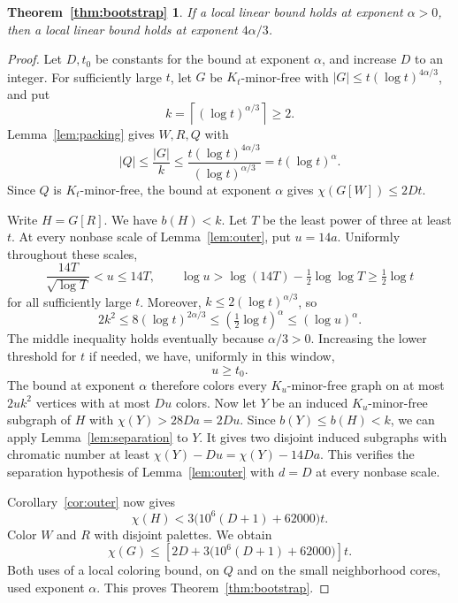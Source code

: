 \documentclass[11pt]{article}
\newtheorem*{bootstraptheorem}{Theorem~\ref{thm:bootstrap}}
\begin{document}
\begin{bootstraptheorem}
If a local linear bound holds at exponent $\alpha>0$, then a local
linear bound holds at exponent $4\alpha/3$.
\end{bootstraptheorem}
\begin{proof}
Let $D,t_0$ be constants for the bound at exponent $\alpha$, and
increase $D$ to an integer.
For sufficiently large $t$, let $G$ be $K_t$-minor-free with
$|G|\le t(\log t)^{4\alpha/3}$, and put
\[
 k=\left\lceil(\log t)^{\alpha/3}\right\rceil\ge2.
\]
Lemma~\ref{lem:packing} gives $W,R,Q$ with
\[
 |Q|\le\frac{|G|}{k}
 \le\frac{t(\log t)^{4\alpha/3}}{(\log t)^{\alpha/3}}
 =t(\log t)^\alpha.
\]
Since $Q$ is $K_t$-minor-free,
the bound at exponent $\alpha$ gives $\chi(G[W])\le2Dt$.

Write $H=G[R]$. We have $b(H)<k$. Let $T$ be the least power of three
at least $t$. At every nonbase scale of Lemma~\ref{lem:outer}, put
$u=14a$. Uniformly throughout these scales,
\[
 \frac{14T}{\sqrt{\log T}}<u\le14T,
 \qquad
 \log u>\log(14T)-\tfrac12\log\log T
 \ge\tfrac12\log t
\]
for all sufficiently large $t$. Moreover,
$k\le2(\log t)^{\alpha/3}$, so
\[
 2k^2\le8(\log t)^{2\alpha/3}
 \le\left(\tfrac12\log t\right)^\alpha
 \le(\log u)^\alpha.
\]
The middle inequality holds eventually because $\alpha/3>0$.
Increasing the lower threshold for $t$ if needed, we have, uniformly
in this window,
\[
 u\ge t_0.
\]
The bound at exponent $\alpha$ therefore colors every $K_u$-minor-free graph
on at most $2uk^2$ vertices with at most $Du$ colors.
Now let $Y$ be an induced $K_u$-minor-free subgraph of $H$ with
$\chi(Y)>28Da=2Du$. Since $b(Y)\le b(H)<k$, we can apply
Lemma~\ref{lem:separation} to $Y$. It gives two disjoint induced
subgraphs with chromatic number at least
$\chi(Y)-Du=\chi(Y)-14Da$. This verifies the separation
hypothesis of Lemma~\ref{lem:outer} with $d=D$ at every nonbase scale.

Corollary~\ref{cor:outer} now gives
\[
 \chi(H)<3\bigl(10^6(D+1)+62000\bigr)t.
\]
Color $W$ and $R$ with disjoint palettes. We obtain
\[
 \chi(G)\le\left[2D+3\bigl(10^6(D+1)+62000\bigr)\right]t.
\]
Both uses of a local coloring bound, on $Q$ and on the small
neighborhood cores, used exponent $\alpha$. This proves
Theorem~\ref{thm:bootstrap}.
\end{proof}
\end{document}

